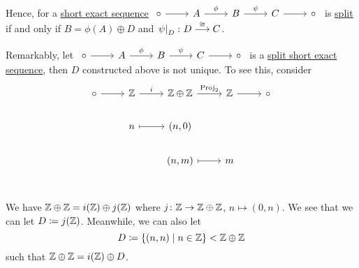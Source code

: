 \begin{remark}
	Hence, for a \hyperref[def:short-exact-sequence]{short exact sequence} \(\begin{tikzcd}
		\circ & A & B & C & \circ
		\arrow["\phi ", from=1-2, to=1-3]
		\arrow["\psi", from=1-3, to=1-4]
		\arrow[from=1-1, to=1-2]
		\arrow[from=1-4, to=1-5]
	\end{tikzcd}\) is \hyperref[def:split-short-exact-sequence]{split} if and only if \(B = \phi (A)\hyperref[def:internal-direct-sum]{\oplus} D\) and \(\left.\psi \right\vert_{D}^{}\colon D \overset{\cong}{\longrightarrow} C \).

	Remarkably, let \(\begin{tikzcd}
		\circ & A & B & C & \circ
		\arrow["\phi ", from=1-2, to=1-3]
		\arrow["\psi", from=1-3, to=1-4]
		\arrow[from=1-1, to=1-2]
		\arrow[from=1-4, to=1-5]
	\end{tikzcd}\) is a \hyperref[def:split-short-exact-sequence]{split short exact sequence}, then \(D\) constructed above is not unique. To see this, consider
	\[
		\begin{tikzcd}
			\circ & \mathbb{\MakeUppercase{z}} & {\mathbb{\MakeUppercase{z}}\oplus \mathbb{\MakeUppercase{z}}  } & \mathbb{\MakeUppercase{z}} & \circ \\
			& n & {(n, 0)} \\
			& & {(n, m)} & {m} \\
			\arrow["i", from=1-2, to=1-3]
			\arrow["{\mathrm{Proj}_2}", from=1-3, to=1-4]
			\arrow[from=1-1, to=1-2]
			\arrow[from=1-4, to=1-5]
			\arrow[maps to, from=2-2, to=2-3]
			\arrow[maps to, from=3-3, to=3-4]
		\end{tikzcd}
	\]
	We have \(\mathbb{\MakeUppercase{z}} \oplus \mathbb{\MakeUppercase{z}} = i(\mathbb{\MakeUppercase{z}} )\oplus j(\mathbb{\MakeUppercase{z}} )\) where \(j\colon \mathbb{\MakeUppercase{z}} \to \mathbb{\MakeUppercase{z}} \oplus \mathbb{\MakeUppercase{z}} \),
	\(n\mapsto (0,n)\). We see that we can let \(D\coloneqq j(\mathbb{\MakeUppercase{z}} )\). Meanwhile, we can also let
	\[
		D \coloneqq \left\{(n, n)\mid n\in \mathbb{\MakeUppercase{z}} \right\}< \mathbb{\MakeUppercase{z}} \oplus\mathbb{\MakeUppercase{z}}
	\]
	such that \(\mathbb{\MakeUppercase{z}} \oplus\mathbb{\MakeUppercase{z}}  = i(\mathbb{\MakeUppercase{z}} )\oplus D\).
\end{remark}

